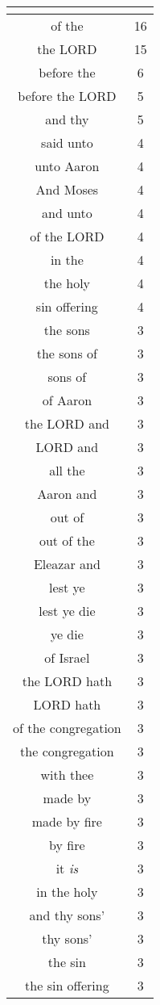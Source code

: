 \begin{center}
\begin{longtable}{|c|c|}
\hline \multicolumn{2}{c}{{ }} \\ \hline
\endfoot 
of the & 16\\ \hline 
the LORD & 15\\ \hline 
before the & 6\\ \hline 
before the LORD & 5\\ \hline 
and thy & 5\\ \hline 
said unto & 4\\ \hline 
unto Aaron & 4\\ \hline 
And Moses & 4\\ \hline 
and unto & 4\\ \hline 
of the LORD & 4\\ \hline 
in the & 4\\ \hline 
the holy & 4\\ \hline 
sin offering & 4\\ \hline 
the sons & 3\\ \hline 
the sons of & 3\\ \hline 
sons of & 3\\ \hline 
of Aaron & 3\\ \hline 
the LORD and & 3\\ \hline 
LORD and & 3\\ \hline 
all the & 3\\ \hline 
Aaron and & 3\\ \hline 
out of & 3\\ \hline 
out of the & 3\\ \hline 
Eleazar and & 3\\ \hline 
lest ye & 3\\ \hline 
lest ye die & 3\\ \hline 
ye die & 3\\ \hline 
of Israel & 3\\ \hline 
the LORD hath & 3\\ \hline 
LORD hath & 3\\ \hline 
of the congregation & 3\\ \hline 
the congregation & 3\\ \hline 
with thee & 3\\ \hline 
made by & 3\\ \hline 
made by fire & 3\\ \hline 
by fire & 3\\ \hline 
it \emph{is} & 3\\ \hline 
in the holy & 3\\ \hline 
and thy sons' & 3\\ \hline 
thy sons' & 3\\ \hline 
the sin & 3\\ \hline 
the sin offering & 3\\ \hline 
\end{longtable}
\end{center}





